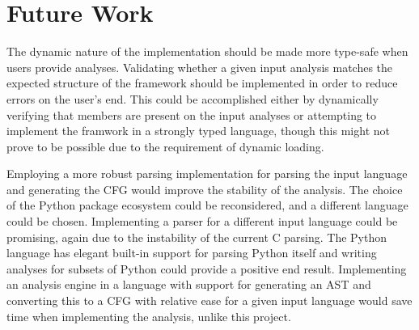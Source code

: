 \section{Future Work}

\newpar The dynamic nature of the implementation should be made more type-safe when users provide analyses. Validating whether a given input analysis matches the expected structure of the framework should be implemented in order to reduce errors on the user's end. This could be accomplished either by dynamically verifying that members are present on the input analyses or attempting to implement the framwork in a strongly typed language, though this might not prove to be possible due to the requirement of dynamic loading.

\newpar Employing a more robust parsing implementation for parsing the input language and generating the CFG would improve the stability of the analysis. The choice of the Python package ecosystem could be reconsidered, and a different language could be chosen. Implementing a parser for a different input language could be promising, again due to the instability of the current C parsing. The Python language has elegant built-in support for parsing Python itself and writing analyses for subsets of Python could provide a positive end result. Implementing an analysis engine in a language with support for generating an AST and converting this to a CFG with relative ease for a given input language would save time when implementing the analysis, unlike this project.